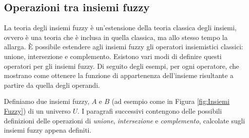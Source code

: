 \documentclass[a4paper,12pt]{report}
\begin{document}
\subsection*{Operazioni tra insiemi fuzzy}
La teoria degli insiemi fuzzy è un'estensione della teoria classica degli insiemi, ovvero è una teoria che è inclusa in quella classica, ma allo stesso tempo la allarga.
\`E possibile estendere agli insiemi fuzzy gli operatori insiemistici classici: unione, intersezione e complemento. Esistono vari modi di definire questi operatori per gli insiemi fuzzy. 
Di seguito degli esempi, per ogni operatore, che mostrano come ottenere la funzione di appartenenza dell'insieme risultante a partire da quella degli operandi.

\bigskip
Definiamo due insiemi fuzzy, $A$ e $B$ (ad esempio come in Figura \ref{fig:Insiemi Fuzzy}) di un universo $U$. I paragrafi successivi contengono delle possibili definizioni delle operazioni di \textit{unione}, \textit{intersezione} e \textit{complemento}, calcolate sugli insiemi fuzzy appena definiti.
\end{document}
